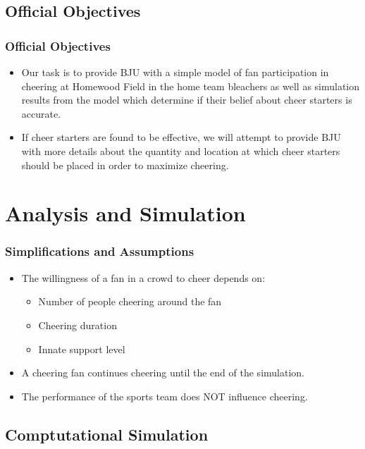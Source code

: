 \documentclass[compress,handout,10pt]{beamer}
\let\olditem\item
\renewcommand{\item}{\setlength{\itemsep}{0.5\baselineskip}\olditem}
\begin{document}
\subsection{Official Objectives}

\begin{frame}
	\frametitle {Official Objectives}
	\begin {itemize}
		\item Our task is to provide BJU with a simple model of fan participation in cheering at Homewood Field in the home team bleachers as well as simulation results from the model which determine if their belief about cheer starters is accurate.
		\item If cheer starters are found to be effective, we will attempt to provide BJU with more details about the quantity and location at which cheer starters should be placed in order to maximize cheering.
		\end {itemize}
\end{frame}

\section{Analysis and Simulation}
\begin{frame}
\frametitle{Simplifications and Assumptions}
\begin{itemize}
	\item The willingness of a fan in a crowd to cheer depends on:
	\begin{itemize}
	 	\item Number of people cheering around the fan
	 	\item Cheering duration
	 	\item Innate support level
	\end{itemize}
	\item A cheering fan continues cheering until the end of the simulation.
	\item The performance of the sports team does NOT influence cheering.
	\end{itemize}
\end{frame}

\subsection{Comptutational Simulation}
\end{document}
